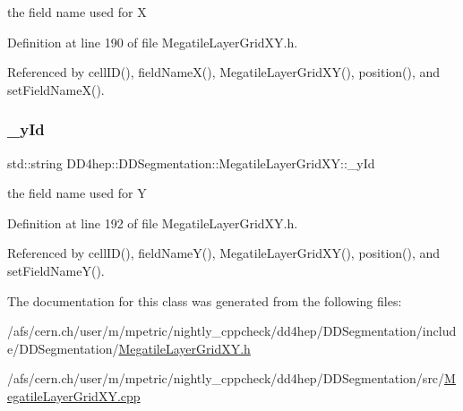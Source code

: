 the field name used for X 



Definition at line 190 of file Megatile\+Layer\+Grid\+X\+Y.\+h.



Referenced by cell\+I\+D(), field\+Name\+X(), Megatile\+Layer\+Grid\+X\+Y(), position(), and set\+Field\+Name\+X().

\hypertarget{class_d_d4hep_1_1_d_d_segmentation_1_1_megatile_layer_grid_x_y_af0dce96a744ec959a58a8d34e3e35469}{}\label{class_d_d4hep_1_1_d_d_segmentation_1_1_megatile_layer_grid_x_y_af0dce96a744ec959a58a8d34e3e35469} 
\subsubsection{\texorpdfstring{\+\_\+y\+Id}{\_yId}}
{\footnotesize\ttfamily std\+::string D\+D4hep\+::\+D\+D\+Segmentation\+::\+Megatile\+Layer\+Grid\+X\+Y\+::\+\_\+y\+Id\hspace{0.3cm}{\ttfamily [protected]}}



the field name used for Y 



Definition at line 192 of file Megatile\+Layer\+Grid\+X\+Y.\+h.



Referenced by cell\+I\+D(), field\+Name\+Y(), Megatile\+Layer\+Grid\+X\+Y(), position(), and set\+Field\+Name\+Y().



The documentation for this class was generated from the following files\+:\begin{DoxyCompactItemize}
\item 
/afs/cern.\+ch/user/m/mpetric/nightly\+\_\+cppcheck/dd4hep/\+D\+D\+Segmentation/include/\+D\+D\+Segmentation/\hyperlink{_megatile_layer_grid_x_y_8h}{Megatile\+Layer\+Grid\+X\+Y.\+h}\item 
/afs/cern.\+ch/user/m/mpetric/nightly\+\_\+cppcheck/dd4hep/\+D\+D\+Segmentation/src/\hyperlink{_megatile_layer_grid_x_y_8cpp}{Megatile\+Layer\+Grid\+X\+Y.\+cpp}\end{DoxyCompactItemize}
